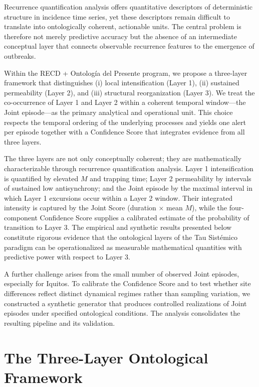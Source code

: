 \documentclass[11pt,a4paper]{article}
\begin{document}
Recurrence quantification analysis offers quantitative descriptors of deterministic structure in incidence time series, yet these descriptors remain difficult to translate into ontologically coherent, actionable units. The central problem is therefore not merely predictive accuracy but the absence of an intermediate conceptual layer that connects observable recurrence features to the emergence of outbreaks.

Within the RECD + Ontología del Presente program, we propose a three-layer framework that distinguishes (i) local intensification (Layer 1), (ii) sustained permeability (Layer 2), and (iii) structural reorganization (Layer 3). We treat the co-occurrence of Layer 1 and Layer 2 within a coherent temporal window—the Joint episode—as the primary analytical and operational unit. This choice respects the temporal ordering of the underlying processes and yields one alert per episode together with a Confidence Score that integrates evidence from all three layers.

The three layers are not only conceptually coherent; they are mathematically characterizable through recurrence quantification analysis. Layer 1 intensification is quantified by elevated $M$ and trapping time; Layer 2 permeability by intervals of sustained low antisynchrony; and the Joint episode by the maximal interval in which Layer 1 excursions occur within a Layer 2 window. Their integrated intensity is captured by the Joint Score (duration $\times$ mean $M$), while the four-component Confidence Score supplies a calibrated estimate of the probability of transition to Layer 3. The empirical and synthetic results presented below constitute rigorous evidence that the ontological layers of the Tau Sistémico paradigm can be operationalized as measurable mathematical quantities with predictive power with respect to Layer 3.

A further challenge arises from the small number of observed Joint episodes, especially for Iquitos. To calibrate the Confidence Score and to test whether site differences reflect distinct dynamical regimes rather than sampling variation, we constructed a synthetic generator that produces controlled realizations of Joint episodes under specified ontological conditions. The analysis consolidates the resulting pipeline and its validation.

\section{The Three-Layer Ontological Framework}
\end{document}

